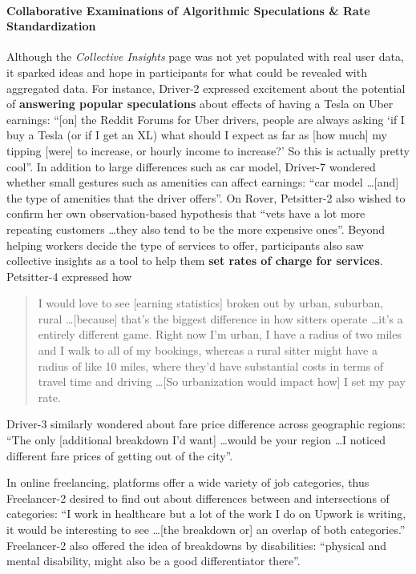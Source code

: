 \paragraph{\textbf{{Collaborative Examinations of Algorithmic Speculations \& Rate Standardization}}} Although the \textit{Collective Insights} page was not yet populated with real user data, it sparked ideas and hope in participants for what could be revealed with aggregated data. For instance, Driver-2 expressed excitement about the potential of \textbf{answering popular speculations} about effects of having a Tesla on Uber earnings: ``[on] the Reddit Forums for Uber drivers, people are always asking `if I buy a Tesla (or if I get an XL) what should I expect as far as [how much] my tipping [were] to increase, or hourly income to increase?' So this is actually pretty cool''. In addition to large differences such as car model, Driver-7 wondered whether small gestures such as amenities can affect earnings: ``car model \dots [and] the type of amenities that the driver offers''. On Rover, Petsitter-2 also wished to confirm her own observation-based hypothesis that ``vets have a lot more repeating customers \dots they also tend to be the more expensive ones''. Beyond helping workers decide the type of services to offer, participants also saw collective insights as a tool to help them \textbf{set rates of charge for services}. Petsitter-4 expressed how
\begin{quote}
    I would love to see [earning statistics] broken out by urban, suburban, rural \dots [because] that's the biggest difference in how sitters operate \dots it's a entirely different game. Right now I'm urban, I have a radius of two miles and I walk to all of my bookings, whereas a rural sitter might have a radius of like 10 miles, where they'd have substantial costs in terms of travel time and driving \dots [So urbanization would impact how] I set my pay rate. 
\end{quote}
Driver-3 similarly wondered about fare price difference across geographic regions: ``The only [additional breakdown I'd want] \dots would be your region \dots I noticed different fare prices of getting out of the city''. 


In online freelancing, platforms offer a wide variety of job categories, thus Freelancer-2 desired to find out about differences between and intersections of categories: ``I work in healthcare but a lot of the work I do on Upwork is writing, it would be interesting to see \dots [the breakdown or] an overlap of both categories.'' Freelancer-2 {also} offered the idea of breakdowns by disabilities: ``physical and mental disability, might also be a good differentiator there''.


